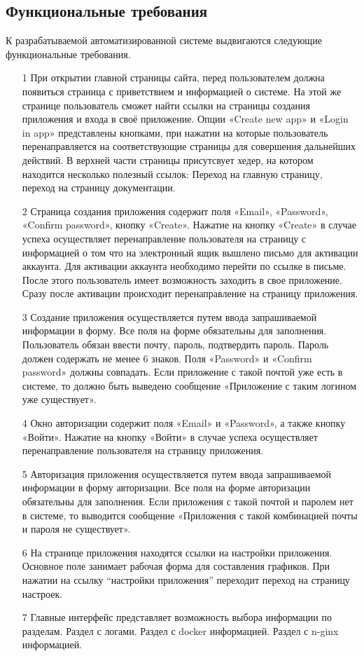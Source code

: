 \subsection{Функциональные требования}

К разрабатываемой автоматизированной системе выдвигаются следующие функциональные требования.
\begin{enumerate}
\item[1] При открытии главной страницы сайта, перед пользователем должна появиться страница с приветствием и информацией о системе. На этой же странице пользователь сможет найти ссылки на страницы создания приложения и входа в своё приложение.
Опции «Create new app» и «Login in app» представлены кнопками, при нажатии на которые пользователь перенаправляется на соответствующие страницы для совершения дальнейших действий. В верхней части страницы присутсвует хедер, на котором находится несколько полезный ссылок: Переход на главную страницу, переход на страницу документации.

\item[2] Страница создания приложения содержит поля «Email», «Password», «Confirm password», кнопку «Create».
Нажатие на кнопку «Create» в случае успеха осуществляет перенаправление пользователя на страницу с информацией о том что на электронный ящик вышлено письмо для активации аккаунта.
Для активации аккаунта необходимо перейти по ссылке в письме. После этого пользователь имеет возможность заходить в свое приложение.
Сразу после активации происходит перенаправление на страницу приложения.

\item[3] Создание приложения осуществляется путем ввода запрашиваемой информации в форму.
Все поля на форме обязательны для заполнения.
Пользователь обязан ввести почту, пароль, подтвердить пароль.
Пароль должен содержать не менее 6 знаков.
Поля «Password» и «Confirm password» должны совпадать.
Если приложение с такой почтой уже есть в системе, то должно быть выведено сообщение «Приложение с таким логином уже существует».

\item[4] Окно авторизации содержит поля «Email» и «Password», а также кнопку «Войти».
Нажатие на кнопку «Войти» в случае успеха осуществляет перенаправление пользователя на страницу приложения.

\item[5] Авторизация приложения осуществляется путем ввода запрашиваемой информации в форму авторизации.
Все поля на форме авторизации обязательны для заполнения.
Если приложения с такой почтой и паролем нет в системе, то выводится сообщение «Приложения с такой комбинацией почты и пароля не существует».
 
\item[6] На странице приложения находятся ссылки на настройки приложения. Основное поле занимает рабочая форма для составления графиков.
При нажатии на ссылку “настройки приложения” переходит переход на страницу настроек.


\item[7] Главные интерфейс представляет возможность выбора информации по разделам. 
Раздел с логами.
Раздел с docker информацией.
Раздел с n-ginx информацией.

\end{enumerate}